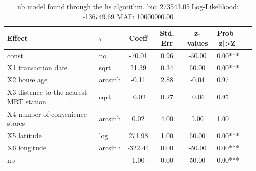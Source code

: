 \begin{table}
	\caption{nb model found through the hs algorithm. bic: 273543.05 Log-Likelihood: -136749.69 MAE: 10000000.00}
	\begin{center}
		\begin{tabular}{|l|l|c|c|c|l|}
			\hline
			Effect & $\tau$ & Coeff & Std. Err & z-values & Prob |z|>Z \\
			\hline
			const & no & -70.01 & 0.96 & -50.00 & 0.00*** \\
			\hline
			X1 transaction date & sqrt & 21.39 & 0.34 & 50.00 & 0.00*** \\
			\hline
			X2 house age & arcsinh & -0.11 & 2.88 & -0.04 & 0.97 \\
			\hline
			X3 distance to the nearest MRT station & sqrt & -0.02 & 0.27 & -0.06 & 0.95 \\
			\hline
			X4 number of convenience stores & arcsinh & 0.02 & 4.00 & 0.00 & 1.00 \\
			\hline
			X5 latitude & log & 271.98 & 1.00 & 50.00 & 0.00*** \\
			\hline
			X6 longitude & arcsinh & -322.44 & 0.00 & -50.00 & 0.00*** \\
			\hline
			nb &  & 1.00 & 0.00 & 50.00 & 0.00*** \\
			\hline
		\end{tabular}
	\end{center}
\end{table}